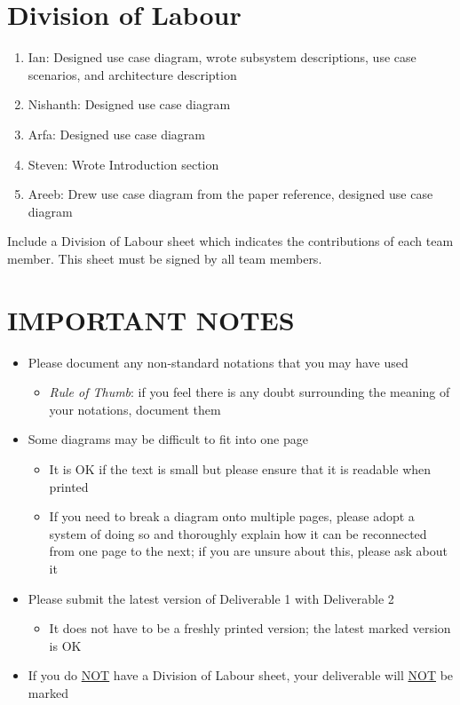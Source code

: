 \documentclass[]{article}
\begin{document}
\appendix
\section{Division of Labour}
\label{sec:division_of_labour}
\begin{enumerate}
	\item Ian: Designed use case diagram, wrote subsystem descriptions, use case scenarios, and architecture description
	\item Nishanth: Designed use case diagram
	\item Arfa: Designed use case diagram
	\item Steven: Wrote Introduction section
	\item Areeb: Drew use case diagram from the paper reference, designed use case diagram
\end{enumerate}
Include a Division of Labour sheet which indicates the contributions of each team member. This sheet must be signed by all team members.

\newpage
\section*{IMPORTANT NOTES}
\begin{itemize}
	\item Please document any non-standard notations that you may have used
	\begin{itemize}
		\item \emph{Rule of Thumb}: if you feel there is any doubt surrounding the meaning of your notations, document them
	\end{itemize}
	\item Some diagrams may be difficult to fit into one page
	\begin{itemize}
		\item It is OK if the text is small but please ensure that it is readable when printed
		\item If you need to break a diagram onto multiple pages, please adopt a system of doing so and thoroughly explain how it can be reconnected from one page to the next; if you are unsure about this, please ask about it
	\end{itemize}
	\item Please submit the latest version of Deliverable 1 with Deliverable 2
	\begin{itemize}
		\item It does not have to be a freshly printed version; the latest marked version is OK
	\end{itemize}
	\item If you do \underline{NOT} have a Division of Labour sheet, your deliverable will \underline{NOT} be marked
\end{itemize}
\end{document}
